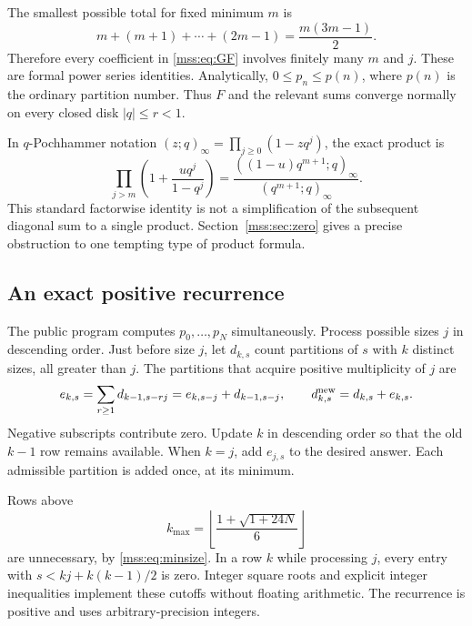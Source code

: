 \documentclass[11pt,letterpaper]{article}
\numberwithin{equation}{section}
\theoremstyle{definition}\newtheorem{definition}[theorem]{Definition}
\theoremstyle{remark}\newtheorem{remark}[theorem]{Remark}
\begin{document}
The smallest possible total for fixed minimum $m$ is
\begin{equation}\label{mss:eq:minsize}
m+(m+1)+\cdots+(2m-1)=\frac{m(3m-1)}2.
\end{equation}
Therefore every coefficient in \eqref{mss:eq:GF} involves finitely many $m$ and $j$. These are formal power series identities. Analytically, $0\le p_n\le p(n)$, where $p(n)$ is the ordinary partition number. Thus $F$ and the relevant sums converge normally on every closed disk $|q|\le r<1$.

In $q$-Pochhammer notation $(z;q)_\infty=\prod_{j\ge0}(1-zq^j)$, the exact product is
\begin{equation}\label{mss:eq:pochhammer}
\prod_{j>m}\left(1+\frac{u q^j}{1-q^j}\right)
=\frac{((1-u)q^{m+1};q)_\infty}{(q^{m+1};q)_\infty}.
\end{equation}
This standard factorwise identity is not a simplification of the subsequent diagonal sum to a single product. Section~\ref{mss:sec:zero} gives a precise obstruction to one tempting type of product formula.

\subsection{An exact positive recurrence}
The public program computes $p_0,\ldots,p_N$ simultaneously. Process possible sizes $j$ in descending order. Just before size $j$, let $d_{k,s}$ count partitions of $s$ with $k$ distinct sizes, all greater than $j$. The partitions that acquire positive multiplicity of $j$ are
\begin{equation}\label{mss:eq:DP}
e_{k,s}=\sum_{r\ge1}d_{k-1,s-rj}
=e_{k,s-j}+d_{k-1,s-j},\qquad
d^{\rm new}_{k,s}=d_{k,s}+e_{k,s}.
\end{equation}
Negative subscripts contribute zero. Update $k$ in descending order so that the old $k-1$ row remains available. When $k=j$, add $e_{j,s}$ to the desired answer. Each admissible partition is added once, at its minimum.

Rows above
\begin{equation}\label{mss:eq:DPcap}
k_{\max}=\left\lfloor\frac{1+\sqrt{1+24N}}6\right\rfloor
\end{equation}
are unnecessary, by \eqref{mss:eq:minsize}. In a row $k$ while processing $j$, every entry with $s<kj+k(k-1)/2$ is zero. Integer square roots and explicit integer inequalities implement these cutoffs without floating arithmetic. The recurrence is positive and uses arbitrary-precision integers.
\end{document}
